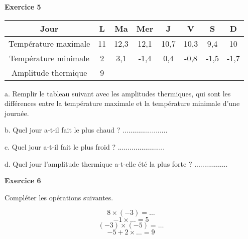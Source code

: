 \documentclass[14pt]{extreport}
\theoremstyle{plain}
\begin{document}
\newpage
\textbf{Exercice 5}

\begin{longtable}{|c|c|c|c|c|c|c|c|}
\hline 
 Jour & L & Ma & Mer & J & V & S & D \\
\hline
Température maximale & 11 & 12,3 & 12,1 & 10,7 & 10,3 & 9,4 & 10 \\
Température minimale & 2 & 3,1 & -1,4 & 0,4 & -0,8 & -1,5 & -1,7 \\
Amplitude thermique & 9 & & & & & & \\
\hline
\end{longtable} 

a. Remplir le tableau suivant avec les amplitudes thermiques, 
qui sont les différences entre la température maximale et la température minimale d'une journée.

b. Quel jour a-t-il fait le plus chaud ? .......................

c. Quel jour a-t-il fait le plus froid ? ........................

d. Quel jour l'amplitude thermique a-t-elle été la plus forte ? .................


\textbf{Exercice 6} %

Compléter les opérations suivantes. 

\[ 8 \times (- 3) =  \ldots \]
\[ -1 \times \ldots = 5 \]
\[ (-3) \times (-5) = \ldots  \]
\[ -5 + 2 \times \ldots = 9 \]


%
%
%
%
%
%
%
%
%
\end{document}
